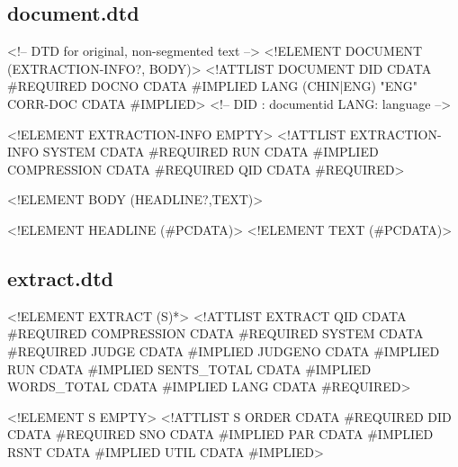 \documentclass[10pt]{article}
\begin{document}
\subsection{document.dtd}
\begin{center}
\begin{boxedverbatim}
<!--  DTD for original, non-segmented text  -->
<!ELEMENT DOCUMENT (EXTRACTION-INFO?, BODY)>
<!ATTLIST DOCUMENT
   DID   CDATA      #REQUIRED
   DOCNO   CDATA      #IMPLIED
   LANG  (CHIN|ENG) "ENG"
   CORR-DOC CDATA   #IMPLIED>
   <!-- DID : documentid
       LANG: language    -->

<!ELEMENT EXTRACTION-INFO EMPTY>
<!ATTLIST EXTRACTION-INFO
    SYSTEM  CDATA  #REQUIRED
    RUN     CDATA  #IMPLIED
    COMPRESSION CDATA #REQUIRED
    QID     CDATA  #REQUIRED>

<!ELEMENT BODY (HEADLINE?,TEXT)>

<!ELEMENT HEADLINE (#PCDATA)>
<!ELEMENT TEXT (#PCDATA)>
\end{boxedverbatim}
\end{center}



\subsection{extract.dtd}
\label{label_extract_dtd}
\begin{center}
\begin{boxedverbatim}
<!ELEMENT EXTRACT (S)*>
<!ATTLIST EXTRACT
   QID         CDATA #REQUIRED
   COMPRESSION CDATA #REQUIRED
   SYSTEM      CDATA #REQUIRED
   JUDGE       CDATA #IMPLIED
   JUDGENO     CDATA #IMPLIED
   RUN         CDATA #IMPLIED
   SENTS_TOTAL CDATA #IMPLIED
   WORDS_TOTAL CDATA #IMPLIED
   LANG        CDATA #REQUIRED>

<!ELEMENT S EMPTY>
<!ATTLIST S
   ORDER       CDATA #REQUIRED
   DID         CDATA #REQUIRED
   SNO         CDATA #IMPLIED
   PAR         CDATA #IMPLIED
   RSNT        CDATA #IMPLIED
   UTIL        CDATA #IMPLIED>
\end{boxedverbatim}
\end{center}
\end{document}
